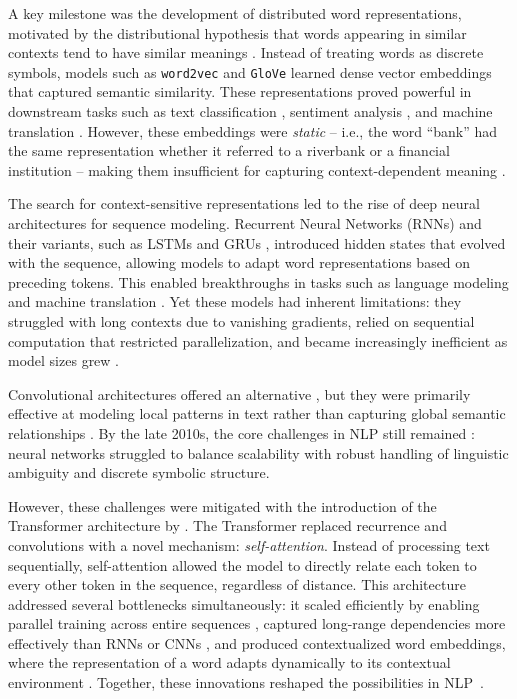 A key milestone was the development of distributed word representations, motivated by the distributional hypothesis that words appearing in similar contexts tend to have similar meanings \cite{harris1954distributional}. Instead of treating words as discrete symbols, models such as \texttt{word2vec} \cite{mikolov2013efficient} and \texttt{GloVe} \cite{pennington2014glove} learned dense vector embeddings that captured semantic similarity. These representations proved powerful in downstream tasks such as text classification \cite{zhang2015character}, sentiment analysis \cite{socher2013recursive}, and machine translation \cite{zhang2015character}.
However, these embeddings were \textit{static} -- i.e., the word “bank” had the same representation whether it referred to a riverbank or a financial institution -- making them insufficient for capturing context-dependent meaning \cite{dai2019transformerxlattentivelanguagemodels}.


The search for context-sensitive representations led to the rise of deep neural architectures for sequence modeling. Recurrent Neural Networks (RNNs) \cite{elman1990finding} and their variants, such as LSTMs \cite{hochreiter1997long} and GRUs \cite{chung2014empirical}, introduced hidden states that evolved with the sequence, allowing models to adapt word representations based on preceding tokens. This enabled breakthroughs in tasks such as language modeling and machine translation \cite{sutskever2014sequence}. Yet these models had inherent limitations: they struggled with long contexts due to vanishing gradients, relied on sequential computation that restricted parallelization, and became increasingly inefficient as model sizes grew \cite{bengio1994learning,pascanu2013construct}.

Convolutional architectures offered an alternative \cite{kalchbrenner2014convolutional, gehring2017convolutional}, but they were primarily effective at modeling local patterns in text rather than capturing global semantic relationships \cite{johnson2017deep}. By the late 2010s, the core challenges in NLP still remained \cite{goldberg2018neural}: neural networks struggled to balance scalability with robust handling of linguistic ambiguity and discrete symbolic structure.

However, these challenges were mitigated with the introduction of the Transformer architecture by \citet{vaswani2017attention}. The Transformer replaced recurrence and convolutions with a novel mechanism: \textit{self-attention}. Instead of processing text sequentially, self-attention allowed the model to directly relate each token to every other token in the sequence, regardless of distance. This architecture addressed several bottlenecks simultaneously: it scaled efficiently by enabling parallel training across entire sequences \cite{vaswani2017attention}, captured long-range dependencies more effectively than RNNs or CNNs \cite{tang2019distilling}, and produced contextualized word embeddings, where the representation of a word adapts dynamically to its contextual environment \cite{peters-etal-2018-deep}. Together, these innovations reshaped the possibilities in NLP~\cite{wolf2020transformers}.

